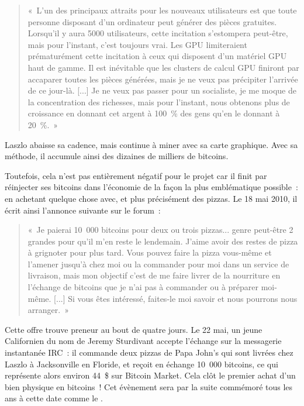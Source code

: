 \begin{quote}
«~L'un des principaux attraits pour les nouveaux utilisateurs est que toute personne disposant d'un ordinateur peut générer des pièces gratuites. Lorsqu'il y aura 5000 utilisateurs, cette incitation s'estompera peut-être, mais pour l'instant, c'est toujours vrai. Les GPU limiteraient prématurément cette incitation à ceux qui disposent d'un matériel GPU haut de gamme. Il est inévitable que les clusters de calcul GPU finiront par accaparer toutes les pièces générées, mais je ne veux pas précipiter l'arrivée de ce jour-là. [...] Je ne veux pas passer pour un socialiste, je me moque de la concentration des richesses, mais pour l'instant, nous obtenons plus de croissance en donnant cet argent à 100~\% des gens qu'en le donnant à 20~\%.~»
\end{quote}

Laszlo abaisse sa cadence, mais continue à miner avec sa carte graphique. Avec sa méthode, il accumule ainsi des dizaines de milliers de bitcoins.

Toutefois, cela n'est pas entièrement négatif pour le projet car il finit par réinjecter ses bitcoins dans l'économie de la façon la plus emblématique possible~: en achetant quelque chose avec, et plus précisément des pizzas. Le 18 mai 2010, il écrit ainsi l'annonce suivante sur le forum~:

\begin{quote}
«~Je paierai 10~000 bitcoins pour deux ou trois pizzas... genre peut-être 2 grandes pour qu'il m'en reste le lendemain. J'aime avoir des restes de pizza à grignoter pour plus tard. Vous pouvez faire la pizza vous-même et l'amener jusqu'à chez moi ou la commander pour moi dans un service de livraison, mais mon objectif c'est de me faire livrer de la nourriture en l'échange de bitcoins que je n'ai pas à commander ou à préparer moi-même. [...] Si vous êtes intéressé, faites-le moi savoir et nous pourrons nous arranger.~»
\end{quote}

Cette offre trouve preneur au bout de quatre jours. Le 22 mai, un jeune Californien du nom de Jeremy Sturdivant accepte l'échange sur la messagerie instantanée IRC~: il commande deux pizzas de Papa John's qui sont livrées chez Laszlo à Jacksonville en Floride, et reçoit en échange 10~000 bitcoins, ce qui représente alors environ 44~\$ sur Bitcoin Market. Cela clôt le premier achat d'un bien physique en bitcoins~! Cet évènement sera par la suite commémoré tous les ans à cette date comme le .

